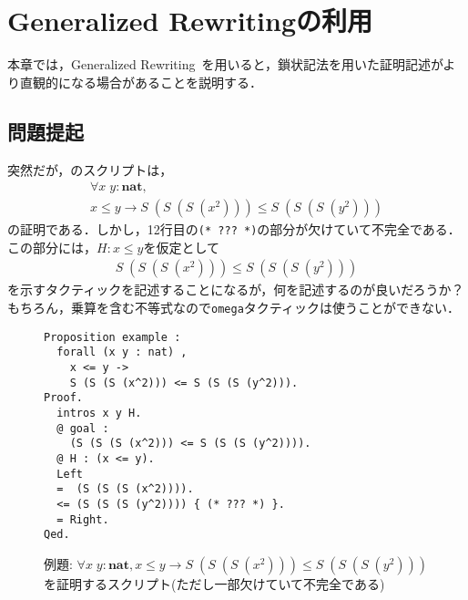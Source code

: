\documentclass[submit]{ipsj}
\begin{document}
\section{Generalized Rewritingの利用}

本章では，Generalized Rewriting~\cite{JFR1574}を用いると，鎖状記法を用いた証明記述がより直観的になる場合があることを説明する．

\subsection{問題提起}\label{subsec:question}

突然だが，のスクリプトは，
\[
\begin{array}{l}
\forall x \; y : \mathbf{nat} \mathrel{,}\\
 x \leq y \to S\;(S\;(S\; (x^2))) \leq S\;(S\;(S\; (y^2)))
\end{array}
\]
の証明である．しかし，12行目の\verb+(* ??? *)+の部分が欠けていて不完全である．この部分には，$H : x \leq y$を仮定として
\begin{eqnarray}
S\;(S\;(S\; (x^2))) \leq S\;(S\;(S\; (y^2))) \label{fml:goal}
\end{eqnarray}
を示すタクティックを記述することになるが，何を記述するのが良いだろうか？ もちろん，乗算を含む不等式なので\verb+omega+タクティックは使うことができない．
\begin{figure}[t]
\begin{mdframed}
\begin{verbatim}
Proposition example :
  forall (x y : nat) ,
    x <= y ->
    S (S (S (x^2))) <= S (S (S (y^2))).
Proof.
  intros x y H.
  @ goal :
    (S (S (S (x^2))) <= S (S (S (y^2)))).
  @ H : (x <= y).
  Left
  =  (S (S (S (x^2)))).
  <= (S (S (S (y^2)))) { (* ??? *) }.
  = Right.
Qed.
\end{verbatim}
\end{mdframed}
\caption{例題: $\forall x \; y : \mathbf{nat} \mathrel{,} x \leq y \to S\;(S\;(S\; (x^2))) \leq S\;(S\;(S\; (y^2)))$を証明するスクリプト(ただし一部欠けていて不完全である)}
\label{fig:need_generalized_rewriting}
\end{figure}
\end{document}

